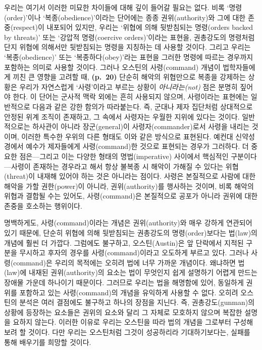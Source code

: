 \documentclass[12pt, oneside]{book}  %
\begin{document}
우리는 여기서 이러한 미묘한 차이들에 대해 깊이 들어갈 필요는 없다. 비록
`명령(order)'이나 `복종(obedience)'이라는 단어에는 종종
권위(authority)와 그에 대한 존중(respect)이 내포되어 있지만, 우리는
`위협에 의해 뒷받침되는 명령(orders backed by threats)' 또는 `강압적
명령(coercive orders)'이라는 표현을, 권총강도의 명령처럼 단지 위협에
의해서만 뒷받침되는 명령을 지칭하는 데 사용할 것이다. 그리고 우리는
`복종(obedience)' 또는 `복종하다(obey)'라는 표현을 그러한 명령에 따르는
경우까지 포함하는 의미로 사용할 것이다. 그러나 오스틴의 사령(command)
개념이 법학자들에게 끼친 큰 영향을 고려할 때, \textbf{(p.~20)} 단순히
해악의 위협만으로 복종을 강제하는 상황은 우리가 자연스럽게
`사령'이라고 부르는 상황이 \emph{아니라는(not)} 점은 분명히
짚어야 한다. 이 단어는 군사적 맥락 외에는 흔히 사용되지 않으며,
사령이라는 표현에는 일반적으로 다음과 같은 강한 함의가
따라붙는다. 즉, 군대나 제자 집단처럼 상대적으로 안정된 위계 조직이
존재하고, 그 속에서 사령자는 우월한 지위에 있다는 것이다. 일반적으로는
하사관이 아니라 장군(general)이 사령자(commander)로서 사령을
내리는 것이며, 이러한 특수한 우위의 다른 형태도 이와 같은 방식으로
표현된다. 예컨대 신약성경에서 예수가 제자들에게 사령(command)한 것으로
표현되는 경우가 그러하다. 더 중요한 점은---그리고 이는 다양한 형태의
명법(imperative) 사이에서 핵심적인 구분이다---사령이 존재하는
경우라고 해서 항상 불복종 시 해악이 가해질 수 있다는 위협(threat)이
내재해 있어야 하는 것은 아니라는 점이다. 사령은 본질적으로
사람에 대한 해악을 가할 권한(power)이 아니라, 권위(authority)를 행사하는
것이며, 비록 해악의 위협과 결합될 수는 있어도, 사령(command)은
본질적으로 공포가 아니라 권위에 대한 존중을 호소하는 행위이다.

명백하게도, 사령(command)이라는 개념은 권위(authority)와 매우 강하게
연관되어 있기 때문에, 단순히 위협에 의해 뒷받침되는 권총강도의
명령(order)보다는 법(law)의 개념에 훨씬 더 가깝다. 그럼에도 불구하고,
오스틴(Austin)은 앞 단락에서 지적된 구분을 무시하고 후자의 경우를
사령(command)이라고 오도하게 부르고 있다. 그러나 사령(command)은 우리의
목적에는 오히려 법에 너무 가까운 개념이다. 왜냐하면 법(law)에 내재된
권위(authority)의 요소는 법이 무엇인지 쉽게 설명하기 어렵게 만드는
장애물 가운데 하나이기 때문이다. 그러므로 우리는 법을 해명함에 있어,
동일하게 권위를 포함하고 있는 사령(command)의 개념을 유익하게 사용할 수
없다. 오히려 오스틴의 분석은 여러 결점에도 불구하고 하나의 장점을
지닌다. 즉, 권총강도(gunman)의 상황에 등장하는 요소들은 권위의 요소와 달리
그 자체로 모호하지 않으며 복잡한 설명을 요하지 않는다. 이러한 이유로
우리는 오스틴을 따라 법의 개념을 그로부터 구성해보려 할 것이다. 다만
우리는 오스틴처럼 그것이 성공하리라 기대하기보다는, 실패를 통해 배우기를
희망할 것이다.
\end{document}
